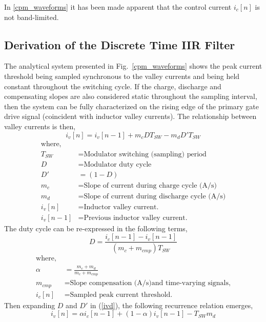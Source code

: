 \documentclass[conference]{IEEEtran}
\begin{document}
In \ref{cpm_waveforms} it has been made apparent that the control current  $ i_c[n]  $ is not band-limited.

\subsection{Derivation of the Discrete Time IIR Filter}
The analytical system presented in Fig.~\ref{cpm_waveforms} shows the peak current threshold being sampled synchronous to the valley currents and being held constant throughout the switching cycle.  If the charge, discharge and compensating slopes are also considered static throughout the sampling interval, then the system can be fully characterized on the rising edge of the primary gate drive signal (coincident with inductor valley currents).  The relationship between valley currents is then,
\begin{equation}
i_v[n] =  i_v[n-1] + m_c D T_{SW} - m_d  D' T_{SW}   \label{ivd}
\end{equation} 
\begin{align*}
\text{where, } \\
T_{SW} &= \text{Modulator switching (sampling) period} \\
D &= \text{Modulator duty cycle} \\
D' &= (1-D) \\
m_c &= \text{Slope of current during charge cycle (A/s)} \\
m_d &= \text{Slope of current during discharge cycle (A/s)}\\
i_v[n] &= \text{Inductor valley current.} \\
i_v[n-1] &= \text{Previous inductor valley current.} 
\end{align*}
The duty cycle can be re-expressed in the following terms,
\begin{equation}
D = \dfrac{i_c [n-1] - i_v [n-1]} {(m_c + m_{cmp})T_{SW}}
\end{equation}
\begin{align*}
\text{where, } \\
\alpha &= \frac{m_c + m_d} {m_c + m_{cmp}} \\
m_{cmp} &= \text{Slope compensation (A/s)}
\text{and time-varying signals,} \\
i_c[n] &= \text{Sampled peak current threshold.} 
\end{align*}
Then expanding $ D $ and $ D' $ in (\ref{ivd}), the following recurrence relation emerges,
\begin{equation}
i_v[n] =  \alpha i_c[n-1] + ( 1 - \alpha ) i_v [n-1] - T_{SW} m_d   \label{ivn}
\end{equation}
\end{document}
